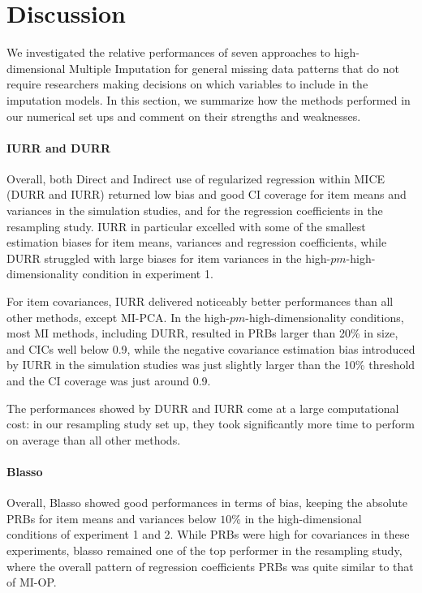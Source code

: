 \section{Discussion}

We investigated the relative performances of seven approaches to high-dimensional Multiple Imputation for general 
missing data patterns that do not require researchers making decisions on which variables to include in the imputation models. 
In this section, we summarize how the methods performed in our numerical set ups and comment on their strengths and weaknesses.

\paragraph{IURR and DURR}
	Overall, both Direct and Indirect use of regularized regression within MICE (DURR and IURR) returned low bias and good 
	CI coverage for item means and variances in the simulation studies, and for the regression coefficients in the 
	resampling study.
	IURR in particular excelled with some of the smallest estimation biases for item means, variances and 
	regression coefficients, while DURR struggled with large biases for item variances in the high-$pm$-high-dimensionality 
	condition in experiment 1.

	For item covariances, IURR delivered noticeably better performances than all other methods, except MI-PCA.
	In the high-$pm$-high-dimensionality conditions, most MI methods, including DURR, resulted in PRBs larger than 20\% in size, 
	and CICs well below 0.9, while the negative covariance estimation bias introduced by IURR in the simulation 
	studies was just slightly larger than the 10\% threshold and the CI coverage was just around 0.9.

	The performances showed by DURR and IURR come at a large computational cost:
	in our resampling study set up, they took significantly more time to perform on average than all other methods.

\paragraph{Blasso}
	Overall, Blasso showed good performances in terms of bias, keeping the absolute PRBs for item means 
	and variances below $10\%$ in the high-dimensional conditions of experiment 1 and 2.
	While PRBs were high for covariances in these experiments, blasso remained one of the top performer
	in the resampling study, where the overall pattern of regression coefficients PRBs was quite similar
	to that of MI-OP.

